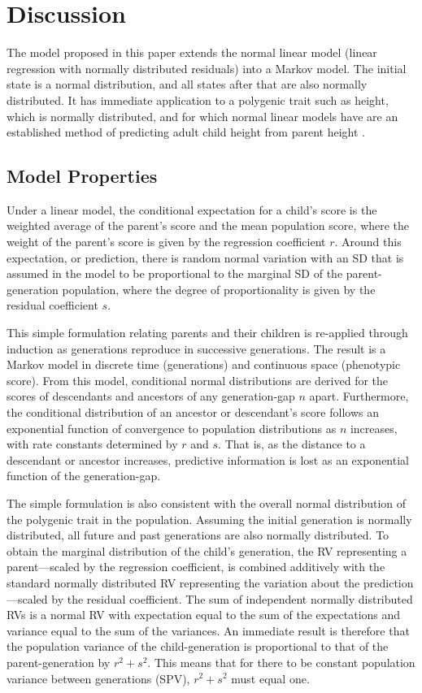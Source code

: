\documentclass{svproc} %
\begin{document}
\section{Discussion}

The model proposed in this paper extends the normal linear model (linear regression with normally distributed residuals) into a Markov model. The initial state is a normal distribution, and all states after that are also normally distributed. It has immediate application to a polygenic trait such as height, which is normally distributed, and for which normal linear models have are an established method of predicting adult child height from parent height \cite{luo}.

\subsection{Model Properties}

Under a linear model, the conditional expectation for a child's score is the weighted average of the parent's score and the mean population score, where the weight of the parent's score is given by the regression coefficient $r$. Around this expectation, or prediction, there is random normal variation with an SD that is assumed in the model to be proportional to the marginal SD of the parent-generation population, where the degree of proportionality is given by the residual coefficient $s$. 

This simple formulation relating parents and their children is re-applied through induction as generations reproduce in successive generations. The result is a Markov model in discrete time (generations) and continuous space (phenotypic score). From this model, conditional normal distributions are derived for the scores of descendants and ancestors of any generation-gap $n$ apart. Furthermore, the conditional distribution of an ancestor or descendant's score follows an exponential function of convergence to population distributions as $n$ increases, with rate constants determined by $r$ and $s$. That is, as the distance to a descendant or ancestor increases, predictive information is lost as an exponential function of the generation-gap. 

The simple formulation is also consistent with the overall normal distribution of the polygenic trait in the population. Assuming the initial generation is normally distributed, all future and past generations are also normally distributed. To obtain the marginal distribution of the child's generation, the RV representing a parent---scaled by the regression coefficient, is combined additively with the standard normally distributed RV representing the variation about the prediction---scaled by the residual coefficient. The sum of independent normally distributed RVs is a normal RV with expectation equal to the sum of the expectations and variance equal to the sum of the variances. An immediate result is therefore that the population variance of the child-generation is proportional to that of the parent-generation by $r^2 + s^2$. This means that for there to be constant population variance between generations (SPV), $r^2 + s^2$ must equal one. 
\end{document}

